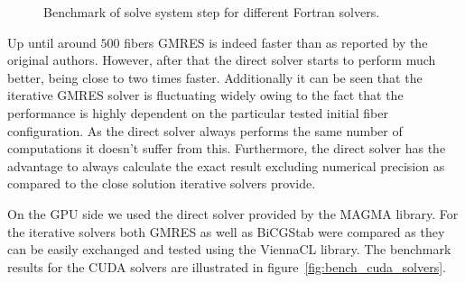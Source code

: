 \documentclass[a4paper,11pt]{kth-mag}
\begin{document}
\begin{figure}[!htbp]
  \centering
  \caption{Benchmark of solve system step for different Fortran solvers.}
  \label{fig:bench_openmp_solvers}
\end{figure}

Up until around $500$ fibers GMRES is indeed faster than as reported by the original authors. However, after that the direct solver starts to perform much better, being close to two times faster. Additionally it can be seen that the iterative GMRES solver is fluctuating widely owing to the fact that the performance is highly dependent on the particular tested initial fiber configuration. As the direct solver always performs the same number of computations it doesn't suffer from this. Furthermore, the direct solver has the advantage to always calculate the exact result excluding numerical precision as compared to the close solution iterative solvers provide.

On the GPU side we used the direct solver provided by the MAGMA library. For the iterative solvers both GMRES as well as BiCGStab were compared as they can be easily exchanged and tested using the ViennaCL library. The benchmark results for the CUDA solvers are illustrated in figure~\ref{fig:bench_cuda_solvers}.
\end{document}
